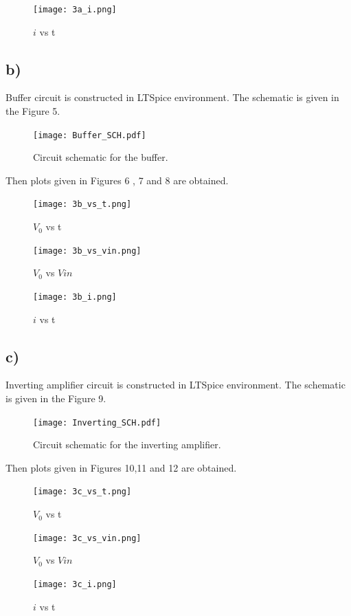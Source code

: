 \documentclass[letterpaper,12pt]{article}
\begin{document}
\begin{figure}[H]
	\centering
   \texttt{[image: 3a\_i.png]}
   \caption{\(i\) vs t}
\end{figure}

\subsection{b)}
Buffer circuit is constructed in LTSpice environment. The schematic is given in the Figure 5.
\begin{figure}[H]
	\centering
   \texttt{[image: Buffer\_SCH.pdf]}
   \caption{Circuit schematic for the buffer.}
\end{figure} 
Then plots given in Figures 6 , 7 and 8 are obtained.
\begin{figure}[H]
	\centering
   \texttt{[image: 3b\_vs\_t.png]}
   \caption{\(V_0\) vs t}
\end{figure}

\begin{figure}[H]
	\centering
   \texttt{[image: 3b\_vs\_vin.png]}
   \caption{\(V_0\) vs \(V{in}\)}
\end{figure}

\begin{figure}[H]
	\centering
   \texttt{[image: 3b\_i.png]}
   \caption{\(i\) vs t}
\end{figure}

\subsection{c)}
Inverting amplifier circuit is constructed in LTSpice environment. The schematic is given in the Figure 9.
\begin{figure}[H]
	\centering
   \texttt{[image: Inverting\_SCH.pdf]}
   \caption{Circuit schematic for the inverting amplifier.}
\end{figure} 
Then plots given in Figures 10,11 and 12 are obtained.
\begin{figure}[H]
	\centering
   \texttt{[image: 3c\_vs\_t.png]}
   \caption{\(V_0\) vs t}
\end{figure}

\begin{figure}[H]
	\centering
   \texttt{[image: 3c\_vs\_vin.png]}
   \caption{\(V_0\) vs \(V{in}\)}
\end{figure}

\begin{figure}[H]
	\centering
   \texttt{[image: 3c\_i.png]}
   \caption{\(i\) vs t}
\end{figure}
\end{document}
